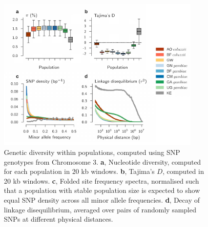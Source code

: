 \documentclass[a4paper,11pt,abstracton,hidelinks]{scrartcl}
\begin{document}
\begin{figure}[t!]
\centering
\includegraphics[width=0.9\textwidth]{artwork/chapter4/pop_params.pdf}
\caption{Genetic diversity within populations, computed using SNP genotypes from Chromosome 3.
%
\textbf{a}, Nucleotide diversity, computed for each population in 20 kb windows.
%
\textbf{b}, Tajima's $D$, computed in 20 kb windows.
%
\textbf{c}, Folded site frequency spectra, normalised such that a population with stable population size is expected to show equal SNP density across all minor allele frequencies.
%
\textbf{d}, Decay of linkage disequilibrium, averaged over pairs of randomly sampled SNPs at different physical distances.
%
}
\label{fig:diversity}
\end{figure}
\end{document}
